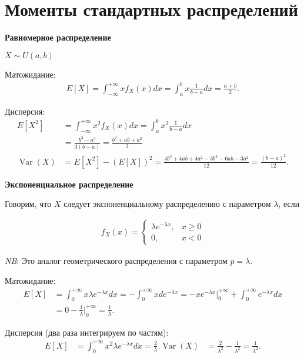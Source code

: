 \documentclass[12pt]{article}
\DeclareMathOperator{\Var}{Var}
\begin{document}
  \section{Моменты стандартных распределений}

  \textbf{Равномерное распределение}

  $X \sim U(a, b)$ 

  Матожидание:
  \begin{align*}
    E[X] = \int_{-\infty}^{+\infty} x f_X(x) dx = \int_{a}^{b} x \frac{1}{b - a} dx = \frac{a + b}{2}. 
  \end{align*}

  Дисперсия:
  \begin{align*}
    E[X^2] &= \int_{-\infty}^{+\infty} x^2 f_X(x) dx = \int_{a}^{b} x^2 \frac{1}{b - a} dx \\
           &= \frac{b^3 - a^3}{3(b - a)} = \frac{b^2 + ab + a^2}{3}\\
    \Var(X) &= E[X^2] - (E[X])^2 = \frac{4b^2 + 4ab + 4a^2 - 3b^2 - 6ab - 3a^2}{12} = \frac{(b - a)^2}{12}. 
  \end{align*}

  \textbf{Экспоненциальное распределение}

  Говорим, что $X$ следует экспоненциальному распределению с параметром $\lambda$, если

  \begin{align*}
    f_X(x) = \begin{cases}
      \lambda e^{-\lambda x}, &x \ge 0 \\
      0, &x < 0
    \end{cases}
  \end{align*}

  \emph{NB}: Это аналог геометрического распределения с параметром $p = \lambda$.

  Матожидание:
  \begin{align*}
    E[X] &= \int_0^{+\infty} x \lambda e^{-\lambda x} dx = - \int_0^{+\infty} x d e^{-\lambda x} = - x e^{-\lambda x} \bigg|_0^{+\infty} + \int_0^{+\infty} e^{-\lambda x} dx \\
    &= 0 - \frac{1}{\lambda} \bigg|_0^{+\infty} = \frac{1}{\lambda}.
  \end{align*}

  Дисперсия (два раза интегрируем по частям):
  \begin{align*}
    E[X] &= \int_0^{+\infty} x^2 \lambda e^{-\lambda x} dx = \frac{2}{\lambda}.
    \Var(X) &= \frac{2}{\lambda^2} - \frac{1}{\lambda^2} = \frac{1}{\lambda^2}.
  \end{align*}
\end{document}
